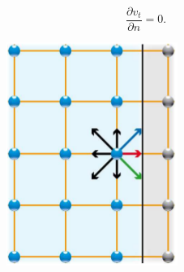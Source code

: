 \begin{equation}
\frac{\partial v_t}{\partial n} = 0.
\end{equation}

\begin{figure}[H]
  \centering
  \begin{subfigure}[h]{0.3\textwidth}
    \includegraphics[width=\textwidth]{img/fig9-1.png}
  \end{subfigure}
  \begin{subfigure}[h]{0.3\textwidth}

\end{subfigure}
\end{figure}
